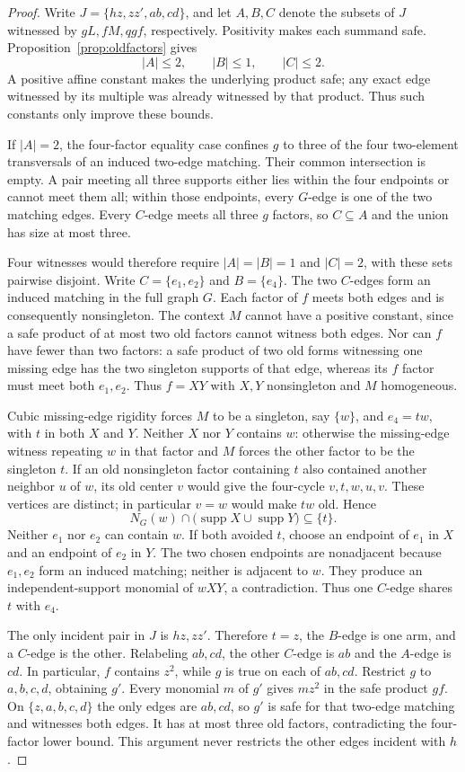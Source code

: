 \documentclass[11pt]{article}
\newcommand{\supp}{\operatorname{supp}}
\theoremstyle{definition}
\theoremstyle{remark}
\begin{document}
\begin{proof}
Write $J=\{hz,zz',ab,cd\}$, and let $A,B,C$ denote the subsets of $J$ witnessed by $gL,fM,qgf$, respectively. Positivity makes each summand safe. Proposition~\ref{prop:oldfactors} gives
\[
 |A|\leq2,\qquad |B|\leq1,\qquad |C|\leq2.
\]
A positive affine constant makes the underlying product safe; any exact edge witnessed by its multiple was already witnessed by that product. Thus such constants only improve these bounds.

If $|A|=2$, the four-factor equality case confines $g$ to three of the four two-element transversals of an induced two-edge matching. Their common intersection is empty. A pair meeting all three supports either lies within the four endpoints or cannot meet them all; within those endpoints, every $G$-edge is one of the two matching edges. Every $C$-edge meets all three $g$ factors, so $C\subseteq A$ and the union has size at most three.

Four witnesses would therefore require $|A|=|B|=1$ and $|C|=2$, with these sets pairwise disjoint. Write $C=\{e_1,e_2\}$ and $B=\{e_4\}$. The two $C$-edges form an induced matching in the full graph $G$. Each factor of $f$ meets both edges and is consequently nonsingleton. The context $M$ cannot have a positive constant, since a safe product of at most two old factors cannot witness both edges. Nor can $f$ have fewer than two factors: a safe product of two old forms witnessing one missing edge has the two singleton supports of that edge, whereas its $f$ factor must meet both $e_1,e_2$. Thus $f=XY$ with $X,Y$ nonsingleton and $M$ homogeneous.

Cubic missing-edge rigidity forces $M$ to be a singleton, say $\{w\}$, and $e_4=tw$, with $t$ in both $X$ and $Y$. Neither $X$ nor $Y$ contains $w$: otherwise the missing-edge witness repeating $w$ in that factor and $M$ forces the other factor to be the singleton $t$. If an old nonsingleton factor containing $t$ also contained another neighbor $u$ of $w$, its old center $v$ would give the four-cycle $v,t,w,u,v$. These vertices are distinct; in particular $v=w$ would make $tw$ old. Hence
\[
 N_G(w)\cap\bigl(\supp X\cup\supp Y\bigr)\subseteq\{t\}.
\]
Neither $e_1$ nor $e_2$ can contain $w$. If both avoided $t$, choose an endpoint of $e_1$ in $X$ and an endpoint of $e_2$ in $Y$. The two chosen endpoints are nonadjacent because $e_1,e_2$ form an induced matching; neither is adjacent to $w$. They produce an independent-support monomial of $wXY$, a contradiction. Thus one $C$-edge shares $t$ with $e_4$.

The only incident pair in $J$ is $hz,zz'$. Therefore $t=z$, the $B$-edge is one arm, and a $C$-edge is the other. Relabeling $ab,cd$, the other $C$-edge is $ab$ and the $A$-edge is $cd$. In particular, $f$ contains $z^2$, while $g$ is true on each of $ab,cd$. Restrict $g$ to $a,b,c,d$, obtaining $g'$. Every monomial $m$ of $g'$ gives $mz^2$ in the safe product $gf$. On $\{z,a,b,c,d\}$ the only edges are $ab,cd$, so $g'$ is safe for that two-edge matching and witnesses both edges. It has at most three old factors, contradicting the four-factor lower bound. This argument never restricts the other edges incident with $h$.
\end{proof}
\end{document}
